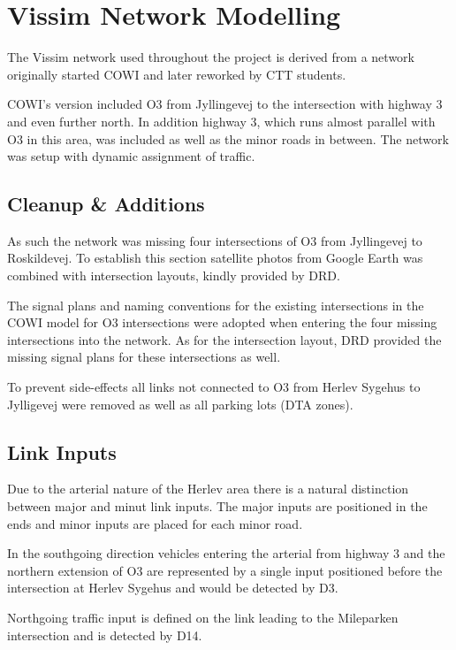 \section{Vissim Network Modelling}

The Vissim network used throughout the project is derived from a network originally started COWI and later reworked by CTT students.

COWI's version included O3 from Jyllingevej to the intersection with highway 3 and even further north. In addition highway 3, which runs almost parallel with O3 in this area, was included as well as the minor roads in between.
The network was setup with dynamic assignment of traffic.

\subsection{Cleanup \& Additions}

As such the network was missing four intersections of O3 from Jyllingevej to Roskildevej. To establish this section satellite photos from Google Earth was combined with intersection layouts, kindly provided by DRD.

The signal plans and naming conventions for the existing intersections in the COWI model for O3 intersections were adopted when entering the four missing intersections into the network. As for the intersection layout, DRD provided the missing signal plans for these intersections as well.

To prevent side-effects all links not connected to O3 from Herlev Sygehus to Jylligevej were removed as well as all parking lots (DTA zones).

\subsection{Link Inputs}

Due to the arterial nature of the Herlev area there is a natural distinction between major and minut link inputs. The major inputs are positioned in the ends and minor inputs are placed for each minor road.

In the southgoing direction vehicles entering the arterial from highway 3 and the northern extension of O3 are represented by a single input positioned before the intersection at Herlev Sygehus and would be detected by D3.

Northgoing traffic input is defined on the link leading to the Mileparken intersection and is detected by D14. 

